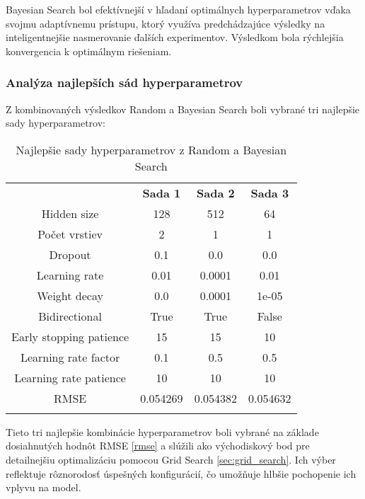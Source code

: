 Bayesian Search bol efektívnejší v hľadaní optimálnych hyperparametrov vďaka svojmu adaptívnemu prístupu, ktorý využíva predchádzajúce výsledky na inteligentnejšie nasmerovanie ďalších experimentov. Výsledkom bola rýchlejšia konvergencia k optimálnym riešeniam.

\newpage

\subsubsection{Analýza najlepších sád hyperparametrov}
Z kombinovaných výsledkov Random a Bayesian Search boli vybrané tri najlepšie sady hyperparametrov:

\begin{table}[ht!]
\centering
\caption{Najlepšie sady hyperparametrov z Random a Bayesian Search}\label{t:best_hyperparams}
\medskip
\small
\begin{tabular}{||c||c|c|c||}
\hhline{|t:====:t|}
\multicolumn{1}{||c||}{\textbf{Hyperparameter}} & \multicolumn{1}{c|}{\textbf{Sada 1}} & \multicolumn{1}{c|}{\textbf{Sada 2}} & \multicolumn{1}{c||}{\textbf{Sada 3}} \\
\hhline{|:====:|}
Hidden size & 128 & 512 & 64 \\
\hline
Počet vrstiev & 2 & 1 & 1 \\
\hline
Dropout & 0.1 & 0.0 & 0.0 \\
\hline
Learning rate & 0.01 & 0.0001 & 0.01 \\
\hline
Weight decay & 0.0 & 0.0001 & 1e-05 \\
\hline
Bidirectional & True & True & False \\
\hline
Early stopping patience & 15 & 15 & 10 \\
\hline
Learning rate factor & 0.1 & 0.5 & 0.5 \\
\hline
Learning rate patience & 10 & 10 & 10 \\
\hline
RMSE & 0.054269 & 0.054382 & 0.054632 \\
\hhline{|b:====:b|}
\end{tabular}
\end{table}

Tieto tri najlepšie kombinácie hyperparametrov boli vybrané na základe dosiahnutých hodnôt RMSE \ref{rmse} a slúžili ako východiskový bod pre detailnejšiu optimalizáciu pomocou Grid Search \ref{sec:grid_search}. Ich výber reflektuje rôznorodosť úspešných konfigurácií, čo umožňuje hlbšie pochopenie ich vplyvu na model.

\newpage

